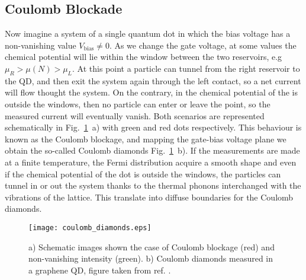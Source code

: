 \subsection{Coulomb Blockade}
Now imagine a system of a single quantum dot in which the bias voltage has a non-vanishing value $V_{\text{bias}}\neq 0$. As we change the gate voltage, at some values the chemical potential will lie within the window between the two reservoirs, e.g $\mu_R>\mu(N)>\mu_L$. At this point a particle can tunnel from the right reservoir to the QD, and then exit the system again through the left contact, so a net current will flow thought the system. On the contrary, in the chemical potential of the is outside the windows, then no particle can enter or leave the point, so the measured current will eventually vanish. Both scenarios are represented schematically in Fig.~\ref{fig:coulomb_diamonds}~a) with green and red dots respectively. This behaviour is known as the Coulomb blockage, and mapping the gate-bias voltage plane we obtain the so-called Coulomb diamonds Fig.~\ref{fig:coulomb_diamonds}~b). If the measurements are made at a finite temperature, the Fermi distribution acquire a smooth shape and even if the chemical potential of the dot is outside the windows, the particles can tunnel in or out the system thanks to the thermal phonons interchanged with the vibrations of the lattice. This translate into diffuse boundaries for the Coulomb diamonds.
\begin{figure}[!htb]
	\centering
	\texttt{[image: coulomb\_diamonds.eps]}
	\caption{a) Schematic images shown the case of Coulomb blockage (red) and non-vanishing intensity (green). b) Coulomb diamonds measured in a graphene QD, figure taken from ref. \cite{Stampfer2008}.}
	\label{fig:coulomb_diamonds}
\end{figure}

